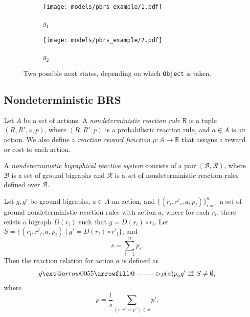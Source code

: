 \documentclass[runningheads]{llncs}
\makeatletter
\providecommand\longrightarrowrhd{\relbar\joinrel\relbar\joinrel\mathrel\rhd}
\providecommand*\xrightarrowrhd[2][]{\ext@arrow 0055{\arrowfill@\relbar\relbar\longrightarrowrhd}{#1}{#2}}
\makeatother
\begin{document}
\begin{figure}
  \centering
  \begin{subfigure}{0.45\textwidth}
    \centering
    \texttt{[image: models/pbrs\_example/1.pdf]}
    \caption{$g_1$}
  \end{subfigure}
  \hfill
  \begin{subfigure}{0.45\textwidth}
    \centering
    \texttt{[image: models/pbrs\_example/2.pdf]}
    \caption{$g_2$}
  \end{subfigure}
  \caption{Two possible next states, depending on which \texttt{Object} is
    taken.}
  \label{pbrs_next_states}
\end{figure}

\subsection{Nondeterministic BRS}


\begin{definition}
  Let $A$ be a set of actions. A \emph{nondeterministic reaction rule}
  $\mathsf{R}$ is a tuple $(R, R', a, p)$, where $(R, R', p)$ is a probabilistic
  reaction rule, and $a \in A$ is an action. We also define a \emph{reaction
    reward function} $\rho : A \to \mathbb{R}$ that assigns a reward or cost to
  each action.
\end{definition}

\begin{definition}
  A \emph{nondeterministic bigraphical reactive system} consists of a pair
  $(\mathcal{B}, \mathcal{R})$, where $\mathcal{B}$ is a set of ground bigraphs
  and $\mathcal{R}$ is a set of nondeterministic reaction rules defined over
  $\mathcal{B}$.

  Let $g, g'$ be ground bigraphs, $a \in A$ an action, and $\{ (r_i, r'_i, a,
  p_i) \}_{i=1}^n$ a set of ground nondeterministic reaction rules with action
  $a$, where for each $r_i$, there exists a bigraph $D(r_i)$ such that $g =
  D(r_i) \circ r_i$. Let $S = \{ (r_i, r'_i, a, p_i) \mid g' = D(r_i) \circ r'_i
  \}$, and
  \[ s = \sum_{i=1}^n p_i. \]
  Then the reaction relation for action $a$ is defined as
  \[ g \xrightarrowrhd[\rho(a)]{p}_a g' \text{ iff } S \ne \emptyset, \]
  where
  \[ p = \frac{1}{s}\sum_{(r, r', a, p') \in S} p'. \]
\end{definition}
\end{document}
